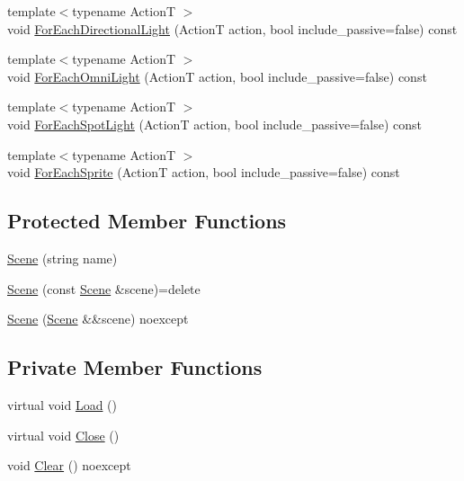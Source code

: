 \begin{DoxyCompactItemize}
$$\item 
{\footnotesize template$<$typename ActionT $>$ }\\void \hyperlink{classmage_1_1_scene_ab1b4131911bf2457707fae459d999f85}{For\+Each\+Directional\+Light} (ActionT action, bool include\+\_\+passive=false) const
\item 
{\footnotesize template$<$typename ActionT $>$ }\\void \hyperlink{classmage_1_1_scene_a9dae59b09d5167d027fc4cf8f09b961c}{For\+Each\+Omni\+Light} (ActionT action, bool include\+\_\+passive=false) const
\item 
{\footnotesize template$<$typename ActionT $>$ }\\void \hyperlink{classmage_1_1_scene_af7419b0edf8a0cae6b113d18231a910a}{For\+Each\+Spot\+Light} (ActionT action, bool include\+\_\+passive=false) const
\item 
{\footnotesize template$<$typename ActionT $>$ }\\void \hyperlink{classmage_1_1_scene_af33b14f081e0b3ae5dafc807bb6bf5b4}{For\+Each\+Sprite} (ActionT action, bool include\+\_\+passive=false) const
\end{DoxyCompactItemize}
\subsection*{Protected Member Functions}
\begin{DoxyCompactItemize}
\item 
\hyperlink{classmage_1_1_scene_aaed505892f2a639db47e5d5767f41337}{Scene} (string name)
\item 
\hyperlink{classmage_1_1_scene_a88d83ccb2e10549d5370f850b2b4c228}{Scene} (const \hyperlink{classmage_1_1_scene}{Scene} \&scene)=delete
\item 
\hyperlink{classmage_1_1_scene_afeae10a3a50bf1d624faa6bd0bf33a7d}{Scene} (\hyperlink{classmage_1_1_scene}{Scene} \&\&scene) noexcept
\end{DoxyCompactItemize}
\subsection*{Private Member Functions}
\begin{DoxyCompactItemize}
\item 
virtual void \hyperlink{classmage_1_1_scene_a1fb4a93eaa2f6a9e20594e205abb9a32}{Load} ()
\item 
virtual void \hyperlink{classmage_1_1_scene_a16786d7fcf0b813e2e94061b082cfd1d}{Close} ()
\item 
void \hyperlink{classmage_1_1_scene_adf4a5b3885e34336caa5f145f55e01e1}{Clear} () noexcept
\end{DoxyCompactItemize}

